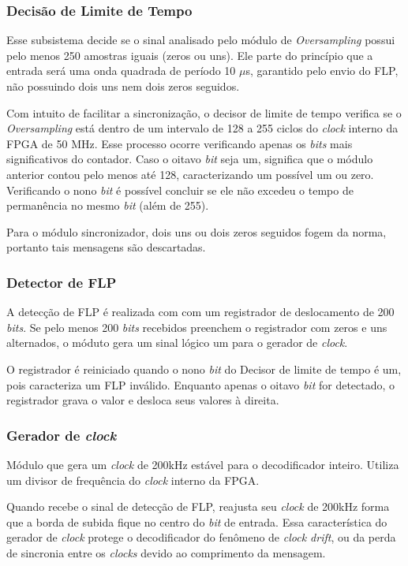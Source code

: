 	\subsubsection{Decisão de Limite de Tempo}
	Esse subsistema decide se o sinal analisado pelo módulo de \textit{Oversampling} possui pelo menos 250 amostras iguais (zeros ou uns). Ele parte do princípio que a entrada será uma onda quadrada de período 10 $\mu$s, garantido pelo envio do FLP, não possuindo dois uns nem dois zeros seguidos.

	Com intuito de facilitar a sincronização, o decisor de limite de tempo verifica se o \textit{Oversampling} está dentro de um intervalo de 128 a 255 ciclos do \textit{clock} interno da FPGA de 50 MHz. Esse processo ocorre verificando apenas os \textit{bits} mais significativos do contador. Caso o oitavo \textit{bit} seja um, significa que o módulo anterior contou pelo menos até 128, caracterizando um possível um ou zero. Verificando o nono \textit{bit} é possível concluir se ele não excedeu o tempo de permanência no mesmo \textit{bit} (além de 255).

	Para o módulo sincronizador, dois uns ou dois zeros seguidos fogem da norma, portanto tais mensagens são descartadas.

	\subsubsection{Detector de FLP}
	A detecção de FLP é realizada com com um registrador de deslocamento de 200 \textit{bits}. Se pelo menos 200 \textit{bits} recebidos preenchem o registrador com zeros e uns alternados, o móduto gera um sinal lógico um para o gerador de \textit{clock}.

	O registrador é reiniciado quando o nono \textit{bit} do Decisor de limite de tempo é um, pois caracteriza um FLP inválido. Enquanto apenas o oitavo \textit{bit} for detectado, o registrador grava o valor e desloca seus valores à direita.

	\subsubsection{Gerador de \textit{clock}}
	Módulo que gera um \textit{clock} de 200kHz estável para o decodificador inteiro. Utiliza um divisor de frequência do \textit{clock} interno da FPGA.

	Quando recebe o sinal de detecção de FLP, reajusta seu \textit{clock} de 200kHz forma que a borda de subida fique no centro do \textit{bit} de entrada. Essa característica do gerador de \textit{clock} protege o decodificador do fenômeno de \textit{clock drift}, ou da perda de sincronia entre os \textit{clocks} devido ao comprimento da mensagem.

